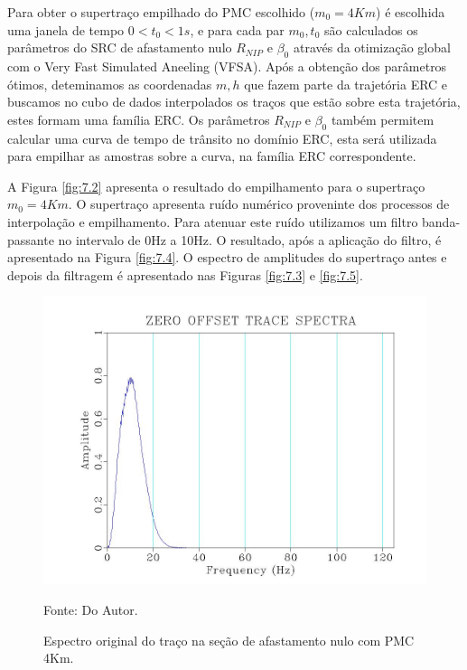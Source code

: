 Para obter o supertraço empilhado do PMC escolhido ($m_0=4Km$) é escolhida uma janela de tempo $0<t_0<1s$, 
e para cada par $m_0,t_0$
são calculados os parâmetros do SRC de afastamento nulo $R_{NIP}$ e $\beta_0$ através da otimização global com o Very Fast
Simulated Aneeling (VFSA). Após a obtenção dos parâmetros ótimos, deteminamos as coordenadas $m,h$ que fazem parte da trajetória ERC
e buscamos no cubo de dados interpolados os traços que estão sobre esta trajetória, estes formam uma família ERC.
Os parâmetros $R_{NIP}$ e $\beta_0$ também permitem calcular uma curva de tempo de trânsito no domínio ERC, esta será utilizada
para empilhar as amostras sobre a curva, na família ERC correspondente.

A Figura \ref{fig:7.2} apresenta o resultado do empilhamento para o supertraço $m_0=4Km$. O supertraço apresenta ruído numérico
proveninte dos processos de interpolação e empilhamento. Para atenuar este ruído utilizamos um filtro banda-passante no 
intervalo de 0Hz a 10Hz. O resultado, após a aplicação do filtro, é apresentado na Figura \ref{fig:7.4}. O espectro de amplitudes
do supertraço antes e depois da filtragem é apresentado nas Figuras \ref{fig:7.3} e \ref{fig:7.5}.

\begin{figure}
\caption{Espectro original do traço na seção de afastamento nulo com PMC 4Km.}
\begin{center}
\includegraphics[scale=0.4]{images/originalTraceSpectra.jpeg}
\vspace{-0.3cm}
\end{center}
\begin{center}
 Fonte: Do Autor.
\end{center}
\label{fig:7.1}
\end{figure}


